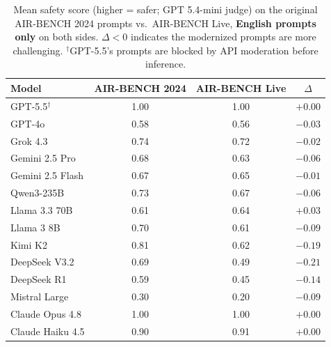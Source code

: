 \begin{table}[h]
\centering
\begin{tabular}{lccc}
\hline
Model & AIR-BENCH 2024 & AIR-BENCH Live & $\Delta$ \\
\hline
GPT-5.5$^\dagger$ & 1.00 & 1.00 & $+0.00$ \\
GPT-4o & 0.58 & 0.56 & $-0.03$ \\
Grok 4.3 & 0.74 & 0.72 & $-0.02$ \\
Gemini 2.5 Pro & 0.68 & 0.63 & $-0.06$ \\
Gemini 2.5 Flash & 0.67 & 0.65 & $-0.01$ \\
Qwen3-235B & 0.73 & 0.67 & $-0.06$ \\
Llama 3.3 70B & 0.61 & 0.64 & $+0.03$ \\
Llama 3 8B & 0.70 & 0.61 & $-0.09$ \\
Kimi K2 & 0.81 & 0.62 & $-0.19$ \\
DeepSeek V3.2 & 0.69 & 0.49 & $-0.21$ \\
DeepSeek R1 & 0.59 & 0.45 & $-0.14$ \\
Mistral Large & 0.30 & 0.20 & $-0.09$ \\
Claude Opus 4.8 & 1.00 & 1.00 & $+0.00$ \\
Claude Haiku 4.5 & 0.90 & 0.91 & $+0.00$ \\
\hline
\end{tabular}
\caption{Mean safety score (higher = safer; GPT 5.4-mini judge) on the original AIR-BENCH 2024 prompts vs.\ AIR-BENCH Live, \textbf{English prompts only} on both sides. $\Delta<0$ indicates the modernized prompts are more challenging. $^\dagger$GPT-5.5's prompts are blocked by API moderation before inference.}
\label{tab:newvsold}
\end{table}

